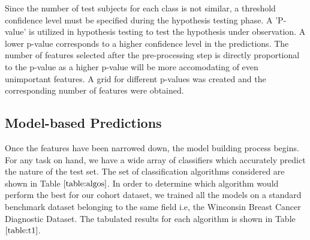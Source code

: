 \documentclass[final,1p,times,twocolumn]{elsarticle}
\begin{document}
Since the number of test subjects for each class is not similar, a threshold confidence level must be specified during the hypothesis testing phase. A 'P-value' is utilized in hypothesis testing to test the hypothesis under observation. A lower p-value corresponds to a higher confidence level in the predictions. The number of features selected after the pre-processing step is directly proportional to the p-value as a higher p-value will be more accomodating of even unimportant features. A grid for different p-values was created and the corresponding number of features were obtained.   

\subsection{Model-based Predictions}

Once the features have been narrowed down, the model building process begins. For any task on hand, we have a wide array of classifiers which accurately predict the nature of the test set. The set of classification algorithms considered are shown in Table $\ref{table:algos}$. In order to determine which algorithm would perform the best for our cohort dataset, we trained all the models on a standard benchmark dataset belonging to the same field i.e, the Winconsin Breast Cancer Diagnostic Dataset. The tabulated results for each algorithm is shown in Table $\ref{table:t1}$.
\end{document}
